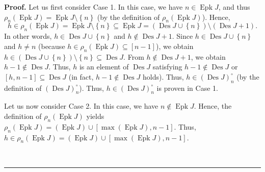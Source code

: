 \documentclass[numbers=enddot,12pt,final,onecolumn,notitlepage]{scrartcl}%
\theoremstyle{definition}
\newenvironment{proof}[1][Proof]{\noindent\textbf{#1.} }{\ \rule{0.5em}{0.5em}}
\begin{document}
\begin{proof}
Let us first consider Case 1. In this case, we have $n\in\operatorname*{Epk}%
J$, and thus $\rho_{n}\left(  \operatorname*{Epk}J\right)
=\operatorname*{Epk}J\setminus\left\{  n\right\}  $ (by the definition of
$\rho_{n}\left(  \operatorname*{Epk}J\right)  $). Hence,
\[
h\in\rho_{n}\left(  \operatorname*{Epk}J\right)  =\operatorname*{Epk}%
J\setminus\left\{  n\right\}  \subseteq\operatorname*{Epk}J=\left(
\operatorname*{Des}J\cup\left\{  n\right\}  \right)  \setminus\left(
\operatorname*{Des}J+1\right)  .
\]
In other words, $h\in\operatorname*{Des}J\cup\left\{  n\right\}  $ and
$h\notin\operatorname*{Des}J+1$. Since $h\in\operatorname*{Des}J\cup\left\{
n\right\}  $ and $h\neq n$ (because $h\in\rho_{n}\left(  \operatorname*{Epk}%
J\right)  \subseteq\left[  n-1\right]  $), we obtain $h\in\left(
\operatorname*{Des}J\cup\left\{  n\right\}  \right)  \setminus\left\{
n\right\}  \subseteq\operatorname*{Des}J$. From $h\notin\operatorname*{Des}%
J+1$, we obtain $h-1\notin\operatorname*{Des}J$. Thus, $h$ is an element of
$\operatorname*{Des}J$ satisfying $h-1\notin\operatorname*{Des}J$ or $\left[
h,n-1\right]  \subseteq\operatorname*{Des}J$ (in fact, $h-1\notin%
\operatorname*{Des}J$ holds). Thus, $h\in\left(  \operatorname*{Des}J\right)
_{n}^{\circ}$ (by the definition of $\left(  \operatorname*{Des}J\right)
_{n}^{\circ}$). Thus, $h\in\left(  \operatorname*{Des}J\right)  _{n}^{\circ}$
is proven in Case 1.

Let us now consider Case 2. In this case, we have $n\notin\operatorname*{Epk}%
J$. Hence, the definition of $\rho_{n}\left(  \operatorname*{Epk}J\right)  $
yields $\rho_{n}\left(  \operatorname*{Epk}J\right)  =\left(
\operatorname*{Epk}J\right)  \cup\left[  \max\left(  \operatorname*{Epk}%
J\right)  ,n-1\right]  $. Thus, $h\in\rho_{n}\left(  \operatorname*{Epk}%
J\right)  =\left(  \operatorname*{Epk}J\right)  \cup\left[  \max\left(
\operatorname*{Epk}J\right)  ,n-1\right]  $.


\end{proof}
\end{document}
